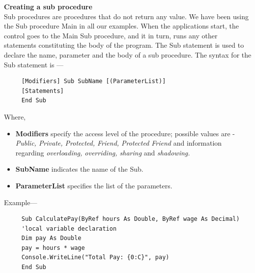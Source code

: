 \documentclass[11pt,dvipsnames,cmyk]{article}
\begin{document}
	 \hfill\break\textbf{Creating a sub procedure}\\
	 Sub procedures are procedures that do not return any value. We have been using the Sub procedure Main in all our examples. When the applications start, the control goes to the Main Sub procedure, and it in turn, runs any other statements constituting the body of the program. The Sub statement is used to declare the name, parameter and the body of a sub procedure. The syntax for the Sub statement is ---
	 \begin{verbatim}
	 [Modifiers] Sub SubName [(ParameterList)] 
	 [Statements]
	 End Sub
	 \end{verbatim}
	 Where,
	 \begin{itemize}
	 	\item  \textbf{Modifiers} specify the access level of the procedure; possible values are - \emph{Public, Private, Protected, Friend, Protected Friend} and information regarding \emph{overloading, overriding, sharing} and \emph{shadowing.}
	 	
	 	\item \textbf{SubName} indicates the name of the Sub.
	 	
	 	\item \textbf{ParameterList} specifies the list of the parameters.
	 \end{itemize}
	 Example---\begin{verbatim}
	 Sub CalculatePay(ByRef hours As Double, ByRef wage As Decimal)
	 'local variable declaration
	 Dim pay As Double
	 pay = hours * wage
	 Console.WriteLine("Total Pay: {0:C}", pay)
	 End Sub
	 \end{verbatim}
	 
\end{document}
